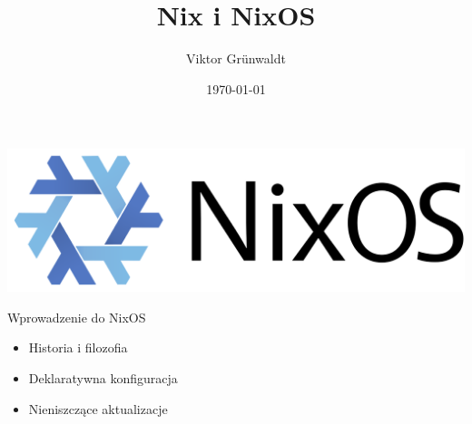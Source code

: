 \documentclass{beamer}
\title{Nix i NixOS}
\author{Viktor Grünwaldt}
\date{\today}
\begin{document}
\begin{frame}
    \titlepage
\end{frame}

\begin{frame}
    \includegraphics[width=0.75\linewidth]{./assets/NixOS_logo.png}
\end{frame}

\begin{frame}{Wprowadzenie do NixOS}
    \begin{itemize}
        \item Historia i filozofia
        \item Deklaratywna konfiguracja
        \item Nieniszczące aktualizacje
    \end{itemize}
\end{frame}
\end{document}
